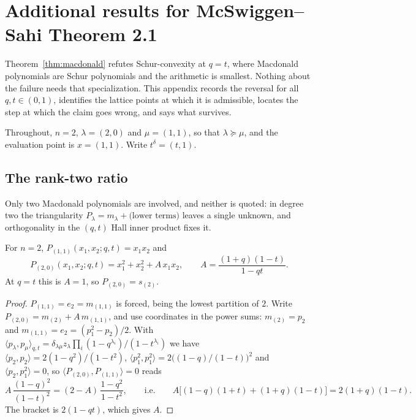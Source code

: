 \section{Additional results for McSwiggen--Sahi Theorem 2.1}
\label{sec:macdonaldomega}

Theorem~\ref{thm:macdonald} refutes Schur-convexity at $q=t$, where Macdonald
polynomials are Schur polynomials and the arithmetic is smallest.  Nothing about
the failure needs that specialization.  This appendix records the reversal for
all $q,t\in(0,1)$, identifies the lattice points at which it is admissible,
locates the step at which the claim goes wrong, and says what survives.

Throughout, $n=2$, $\lambda=(2,0)$ and $\mu=(1,1)$, so that $\lambda\succeq\mu$,
and the evaluation point is $x=(1,1)$.  Write $t^\delta=(t,1)$.

\subsection*{The rank-two ratio}

Only two Macdonald polynomials are involved, and neither is quoted: in degree
two the triangularity $P_\lambda=m_\lambda+\text{(lower terms)}$ leaves a single
unknown, and orthogonality in the $(q,t)$ Hall inner product fixes it.

\begin{lemma}\label{lem:macdonald-rank2}
For $n=2$, $P_{(1,1)}(x_1,x_2;q,t)=x_1x_2$ and
\[
P_{(2,0)}(x_1,x_2;q,t)=x_1^2+x_2^2+A\,x_1x_2,
\qquad
A=\frac{(1+q)(1-t)}{1-qt}.
\]
At $q=t$ this is $A=1$, so $P_{(2,0)}=s_{(2)}$.
\end{lemma}
\begin{proof}
$P_{(1,1)}=e_2=m_{(1,1)}$ is forced, being the lowest partition of $2$.  Write
$P_{(2,0)}=m_{(2)}+A\,m_{(1,1)}$, and use coordinates in the power sums:
$m_{(2)}=p_2$ and $m_{(1,1)}=e_2=(p_1^2-p_2)/2$.  With
$\langle p_\lambda,p_\mu\rangle_{q,t}=\delta_{\lambda\mu}z_\lambda\prod_i(1-q^{\lambda_i})/(1-t^{\lambda_i})$
we have $\langle p_2,p_2\rangle=2(1-q^2)/(1-t^2)$,
$\langle p_1^2,p_1^2\rangle=2\bigl((1-q)/(1-t)\bigr)^2$ and
$\langle p_2,p_1^2\rangle=0$, so $\langle P_{(2,0)},P_{(1,1)}\rangle=0$ reads
\[
A\,\frac{(1-q)^2}{(1-t)^2}=(2-A)\,\frac{1-q^2}{1-t^2},
\qquad\text{i.e.}\qquad
A\bigl[(1-q)(1+t)+(1+q)(1-t)\bigr]=2(1+q)(1-t).
\]
The bracket is $2(1-qt)$, which gives $A$.
\end{proof}

